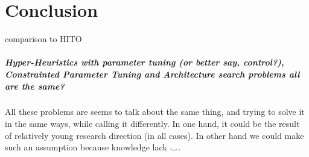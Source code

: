 \chapter{Conclusion}
comparison to HITO~\cite{guizzo2015hyper}

\paragraph{Hyper-Heuristics with parameter tuning (or better say, control?), Constrainted Parameter Tuning and Architecture search problems all are the same?}
All these problems are seems to talk about the same thing, and trying to solve it in the same ways, while calling it differently. In one hand, it could be the result of relatively young research direction (in all cases). In other hand we could make such an assumption because knowledge lack $\smile$.